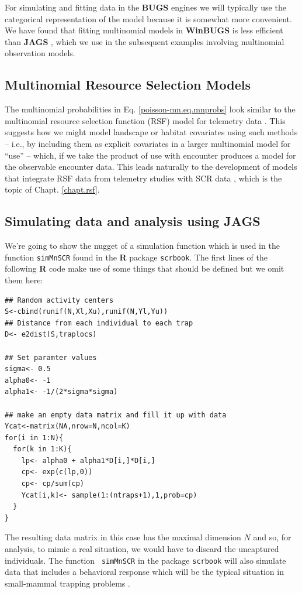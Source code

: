 For simulating and fitting data in the {\bf BUGS} engines we will
typically use the categorical representation of the model because it
is somewhat more convenient.  We have found that fitting multinomial
models in {\bf WinBUGS} is less efficient than {\bf JAGS}
\citep{royle_converse:2012}, which we use in the subsequent examples
involving multinomial observation models.


\subsection{Multinomial  Resource Selection Models}

The multinomial probabilities in Eq. \ref{poisson-mn.eq.mnprobs}
look similar to the 
multinomial resource selection function (RSF) model for telemetry data
\citep{manly_etal:2002, lele_keim:2006}.  This suggests how we might
model landscape or habitat covariates using such methods -- i.e., by
including them as explicit covariates in a larger multinomial model
for ``use'' -- which, if we take the product of use with encounter
produces a model for the observable encounter data. This 
leads naturally to the development of models that integrate RSF data
from telemetry studies with SCR data \citep{royle_chandler:2012},
which is the topic of  Chapt. \ref{chapt.rsf}.





\subsection{Simulating data and analysis using JAGS}

We're going to show the nugget of a simulation function which is
used in the function \mbox{\tt simMnSCR} found in the {\bf R} package
\mbox{\tt scrbook}.  The first lines of the following {\bf R} code
make use of some things that should be defined but we omit them here:
{\small
\begin{verbatim}
## Random activity centers
S<-cbind(runif(N,Xl,Xu),runif(N,Yl,Yu))
## Distance from each individual to each trap
D<- e2dist(S,traplocs)

## Set paramter values
sigma<- 0.5
alpha0<- -1
alpha1<- -1/(2*sigma*sigma)

## make an empty data matrix and fill it up with data
Ycat<-matrix(NA,nrow=N,ncol=K)
for(i in 1:N){
  for(k in 1:K){
    lp<- alpha0 + alpha1*D[i,]*D[i,]
    cp<- exp(c(lp,0))
    cp<- cp/sum(cp)
    Ycat[i,k]<- sample(1:(ntraps+1),1,prob=cp)
  }
}
\end{verbatim}
} 
The resulting data matrix in this case has the maximal dimension $N$
and so, for analysis, to mimic a real situation, we would have to
discard the uncaptured individuals.  The function \mbox{\tt
  simMnSCR} in the package \mbox{\tt scrbook} will also simulate
data that includes a behavioral response
 which will be the
typical situation in small-mammal trapping problems
\citep[see][for details]{converse_royle:2012}.

